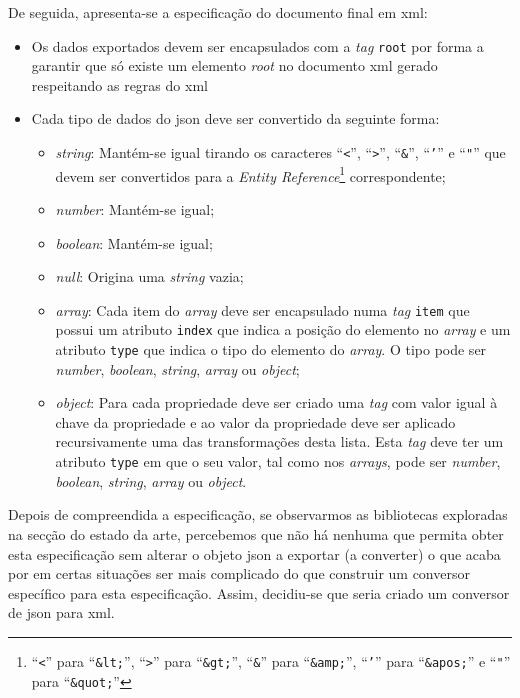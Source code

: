 De seguida, apresenta-se a especificação do documento final em \acrshort{xml}:
\begin{itemize}
    \item Os dados exportados devem ser encapsulados com a \textit{tag} \texttt{root} por forma a garantir que 
    só existe um elemento \textit{root} no documento \acrshort{xml} gerado respeitando as regras do \acrshort{xml}
    \item Cada tipo de dados do \acrshort{json} deve ser convertido da seguinte forma:
    \begin{itemize}
        \item \textit{string}: Mantém-se igual tirando os caracteres ``\texttt{<}'', ``\texttt{>}'', 
        ``\texttt{\&}'', ``\texttt{'}'' e ``\texttt{"}'' que devem ser convertidos para a 
        \textit{Entity Reference}\footnote{``\texttt{<}'' para ``\texttt{\&lt;}'', ``\texttt{>}'' 
        para ``\texttt{\&gt;}'', ``\texttt{\&}'' para ``\texttt{\&amp;}'', ``\texttt{'}'' para ``\texttt{\&apos;}'' 
        e ``\texttt{"}'' para ``\texttt{\&quot;}''} correspondente;
        \item \textit{number}: Mantém-se igual;
        \item \textit{boolean}: Mantém-se igual;
        \item \textit{null}: Origina uma \textit{string} vazia;
        \item \textit{array}: Cada item do \textit{array} deve ser encapsulado numa \textit{tag} \texttt{item} 
        que possui um atributo \texttt{index} que indica a posição do elemento no \textit{array} e um atributo 
        \texttt{type} que indica o tipo do elemento do \textit{array}. O tipo pode ser \textit{number}, 
        \textit{boolean}, \textit{string}, \textit{array} ou \textit{object};
        \item \textit{object}: Para cada propriedade deve ser criado uma \textit{tag} com valor igual à chave da 
        propriedade e ao valor da propriedade deve ser aplicado recursivamente uma das transformações desta lista. 
        Esta \textit{tag} deve ter um atributo \texttt{type} em que o seu valor, tal como nos \textit{arrays}, 
        pode ser \textit{number}, \textit{boolean}, \textit{string}, \textit{array} ou \textit{object}.
    \end{itemize}
\end{itemize}

Depois de compreendida a especificação, se observarmos as bibliotecas exploradas na secção do estado da arte,
percebemos que não há nenhuma que permita obter esta especificação sem alterar o objeto \acrshort{json} a 
exportar (a converter) o que acaba por em certas situações ser mais complicado do que construir um conversor 
específico para esta especificação. Assim, decidiu-se que seria criado um conversor de \acrshort{json} para 
\acrshort{xml}.

